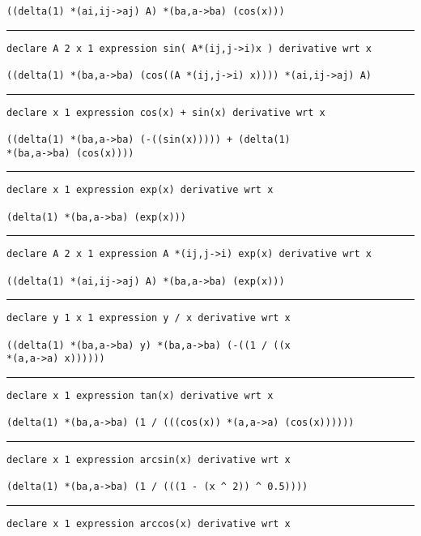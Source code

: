 \documentclass[12pt, a4paper]{report} %
\begin{document}
\begin{multicols}{2}
\begin{verbatim}
((delta(1) *(ai,ij->aj) A) *(ba,a->ba) (cos(x)))
\end{verbatim}
\vspace{-20pt} \rule[-10pt]{\columnwidth}{0.1pt} 
\begin{verbatim}
declare A 2 x 1 expression sin( A*(ij,j->i)x ) derivative wrt x

((delta(1) *(ba,a->ba) (cos((A *(ij,j->i) x)))) *(ai,ij->aj) A)
\end{verbatim}
\vspace{-20pt} \rule[-10pt]{\columnwidth}{0.1pt} 
\begin{verbatim}
declare x 1 expression cos(x) + sin(x) derivative wrt x

((delta(1) *(ba,a->ba) (-((sin(x))))) + (delta(1) 
*(ba,a->ba) (cos(x))))
\end{verbatim}
\vspace{-20pt} \rule[-10pt]{\columnwidth}{0.1pt} 
\begin{verbatim}
declare x 1 expression exp(x) derivative wrt x

(delta(1) *(ba,a->ba) (exp(x)))
\end{verbatim}
\vspace{-20pt} \rule[-10pt]{\columnwidth}{0.1pt} 
\begin{verbatim}
declare A 2 x 1 expression A *(ij,j->i) exp(x) derivative wrt x

((delta(1) *(ai,ij->aj) A) *(ba,a->ba) (exp(x)))
\end{verbatim}
\vspace{-20pt} \rule[-10pt]{\columnwidth}{0.1pt} 
\begin{verbatim}
declare y 1 x 1 expression y / x derivative wrt x

((delta(1) *(ba,a->ba) y) *(ba,a->ba) (-((1 / ((x 
*(a,a->a) x))))))
\end{verbatim}
\vspace{-20pt} \rule[-10pt]{\columnwidth}{0.1pt} 
\begin{verbatim}
declare x 1 expression tan(x) derivative wrt x

(delta(1) *(ba,a->ba) (1 / (((cos(x)) *(a,a->a) (cos(x))))))
\end{verbatim}
\vspace{-20pt} \rule[-10pt]{\columnwidth}{0.1pt} 
\begin{verbatim}
declare x 1 expression arcsin(x) derivative wrt x

(delta(1) *(ba,a->ba) (1 / (((1 - (x ^ 2)) ^ 0.5))))
\end{verbatim}
\vspace{-20pt} \rule[-10pt]{\columnwidth}{0.1pt} 
\begin{verbatim}
declare x 1 expression arccos(x) derivative wrt x


\end{verbatim}
\end{multicols}
\end{document}

